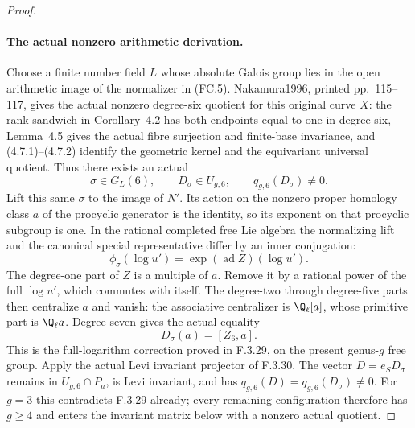 \begin{proof}
\paragraph{The actual nonzero arithmetic derivation.}
Choose a finite number field $L$ whose absolute Galois
group lies in the open arithmetic image of the
normalizer in (FC.5). Nakamura1996, printed
pp.~115--117\cite{AuditNakamura1996}, gives the actual nonzero degree-six
quotient for this original curve $X$: the rank
sandwich in Corollary~4.2 has both endpoints equal
to one in degree six, Lemma~4.5 gives the actual
fibre surjection and finite-base invariance, and
(4.7.1)--(4.7.2) identify the geometric kernel and
the equivariant universal quotient. Thus there
exists an actual
\[
 \sigma\in G_L(6),\qquad D_\sigma\in U_{g,6},
                           \qquad q_{g,6}(D_\sigma)\ne0.
                                                               \tag{FC.5a}
\]
Lift this same $\sigma$ to the image of $N'$.
Its action on the nonzero proper homology class
$a$ of the procyclic generator is the identity,
so its exponent on that procyclic subgroup is
one. In the rational completed free Lie algebra
the normalizing lift and the canonical special
representative differ by an inner conjugation:
\[
       \phi_\sigma(\log u')
                    =\exp(\operatorname{ad}Z)(\log u').
\]
The degree-one part of $Z$ is a multiple of $a$.
Remove it by a rational power of the full
$\log u'$, which commutes with itself. The
degree-two through degree-five parts then
centralize $a$ and vanish: the associative
centralizer is $\Q_\ell[a]$, whose primitive
part is $\Q_\ell a$. Degree seven gives the
actual equality
\[
                         D_\sigma(a)=[Z_6,a].               \tag{FC.5b}
\]
This is the full-logarithm correction proved
in F.3.29, on the present genus-$g$ free group.
Apply the actual Levi invariant projector
of F.3.30. The vector
$D=e_S D_\sigma$ remains in $U_{g,6}\cap P_a$,
is Levi invariant, and has
$q_{g,6}(D)=q_{g,6}(D_\sigma)\ne0$.
For $g=3$ this contradicts F.3.29 already;
every remaining configuration therefore has
$g\geq4$ and enters the invariant matrix
below with a nonzero actual quotient.


\end{proof}
